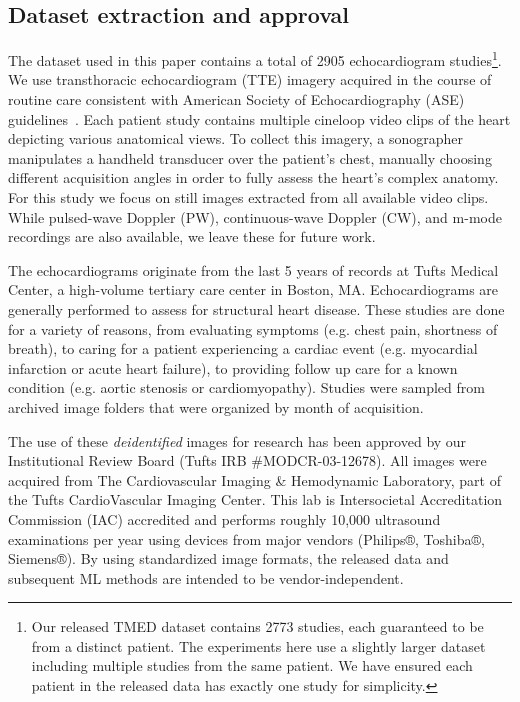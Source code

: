 
\subsection{Dataset extraction and approval}

The dataset used in this paper contains a total of 2905 echocardiogram studies\footnote{Our released TMED dataset contains 2773 studies, each guaranteed to be from a distinct patient. The experiments here use a slightly larger dataset including multiple studies from the same patient. We have ensured each patient in the released data has exactly one study for simplicity.}. 
We use transthoracic echocardiogram (TTE) imagery acquired in the course of routine care consistent with American Society of Echocardiography (ASE)   guidelines~\citep{mitchellGuidelinesPerformingComprehensive2019}.
Each patient study contains multiple cineloop video clips of the heart depicting various anatomical views.
To collect this imagery, a sonographer manipulates a handheld transducer over the patient's chest, manually choosing different acquisition angles in order to fully assess the heart’s complex anatomy.
For this study we focus on still images extracted from all available video clips.
While pulsed-wave Doppler (PW), continuous-wave Doppler (CW), and m-mode recordings are also available, we leave these for future work.


The echocardiograms originate from the last 5 years of records at Tufts Medical Center, a high-volume tertiary care center in Boston, MA.
Echocardiograms are generally performed to assess for structural heart disease. These studies are done for a variety of reasons, from evaluating symptoms (e.g. chest pain, shortness of breath), to caring for a patient experiencing a cardiac event (e.g. myocardial infarction or acute heart failure), to providing follow up care for a known condition (e.g. aortic stenosis or cardiomyopathy). Studies were sampled from archived image folders that were organized by month of acquisition.

The use of these \emph{deidentified} images for research has been approved by our Institutional Review Board (Tufts IRB \#MODCR-03-12678).
All images were acquired from The Cardiovascular Imaging \& Hemodynamic Laboratory, part of the Tufts CardioVascular Imaging Center. 
This lab is Intersocietal Accreditation Commission (IAC) accredited and performs roughly 10,000 ultrasound examinations per year using devices from major vendors (Philips®, Toshiba®, Siemens®).
By using standardized image formats, the released data and subsequent ML methods are intended to be vendor-independent. 

